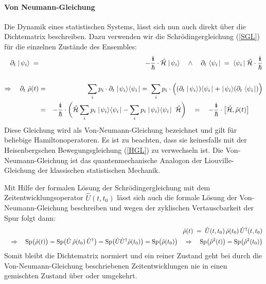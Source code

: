 \paragraph{Von Neumann-Gleichung}

Die Dynamik eines statistischen Systems, lässt sich nun auch direkt über die Dichtematrix beschreiben. Dazu verwenden wir die Schrödingergleichung (\ref{SGL}) für die einzelnen Zustände des Ensembles: 
\begin{eqnarray}
	\dell_t\ket{\psi_i}\;=&&\!\!\!\!\!\!\!\!\!\!\!\!-\frac{\I}{\hbar}\cdot\hat{\ham}\ket{\psi_i} \quad\land\quad \dell_t\;\bra{\psi_i}\;\;=\;\bra{\psi_i}\hat{\ham}\cdot\frac{\I}{\hbar}\nonumber
	\\\;\nonumber\\
	\Rightarrow\quad \dell_t\;\hat{\rho}(t) &=& \sum_i p_i\cdot \dell_t\ket{\psi_i}\bra{\psi_i} \;=\; \sum_i p_i\cdot\Big((\dell_t \ket{\psi_i})\bra{\psi_i}+\ket{\psi_i}(\dell_t\;\bra{\psi_i})\Big) \nonumber
	\\
	&=& -\frac{\I}{\hbar}\cdot\bigg( \hat{\ham}\sum_i p_i \ket{\psi_i}\bra{\psi_i} - \sum_i p_i \ket{\psi_i}\bra{\psi_i} \;\hat{\ham}\bigg) \quad=\quad -\frac{\I}{\hbar}\cdot \big[\hat{\ham},\hat{\rho}(t)\big]\qquad \label{vNGL}
\end{eqnarray}
Diese Gleichung wird als Von-Neumann-Gleichung bezeichnet und gilt für beliebige Hamiltonoperatoren. Es ist zu beachten, dass sie keinesfalls mit der Heisenbergschen Bewegungsgleichung (\ref{HGL}) zu verwechseln ist. Die Von-Neumann-Gleichung ist das quantenmechanische Analogon der Liouville-Gleichung der klassischen statistischen Mechanik. 

Mit Hilfe der formalen Lösung der Schrödingergleichung mit dem Zeitentwicklungsoperator $\hat{U}(t,t_0)$ lässt sich auch die formale Lösung der Von-Neumann-Gleichung beschreiben und wegen der zyklischen Vertauscbarkeit der Spur folgt dann: 
\begin{eqnarray*}
	&&\hat{\rho}(t) \;=\; \hat{U}(t,t_0)\,\hat{\rho}(t_0)\,\hat{U}^{\dagger}(t,t_0)
	\\
	&&\Rightarrow\quad \text{Sp}\big(\hat{\rho}(t)\big)=\text{Sp}\big(\hat{U}\,\hat{\rho}(t_0)\,\hat{U}^{\dagger}\big) = \text{Sp}\big(\hat{U}\hat{U}^{\dagger}\hat{\rho}(t_0)\big) = \text{Sp}\big(\hat{\rho}(t_0)\big) \quad\Rightarrow\quad \text{Sp}\big(\hat{\rho}^2(t)\big)=\text{Sp}\big(\hat{\rho}^2(t_0)\big)
\end{eqnarray*}
Somit bleibt die Dichtematrix normiert und ein reiner Zustand geht bei durch die Von-Neumann-Gleichung beschriebenen Zeitentwicklungen nie in einen gemischten Zustand über oder umgekehrt. 

